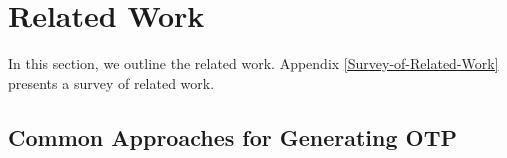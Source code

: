 

\section{Related Work}\label{Related-Work}





%
%
%


In this section, we outline the related work. Appendix \ref{Survey-of-Related-Work} presents a survey of related work. 


\subsection{Common Approaches for Generating OTP}

